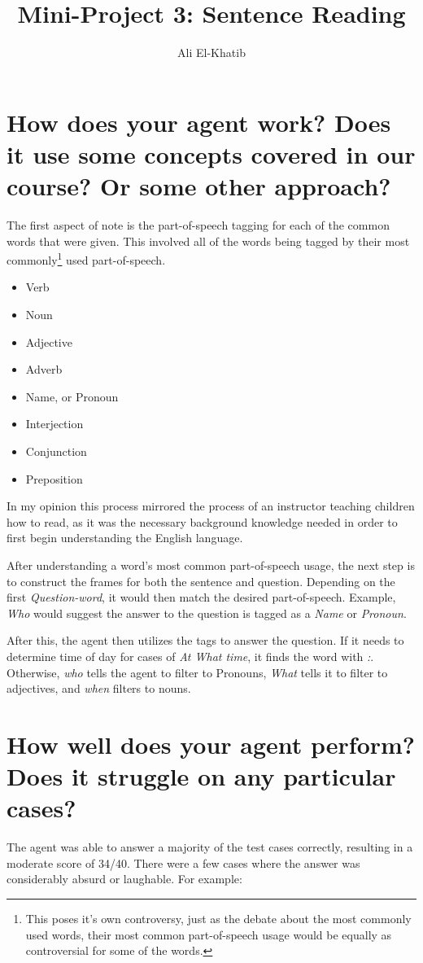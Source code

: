 \documentclass[
	letterpaper, %
]{jdf}
\author{Ali El-Khatib}
\title{Mini-Project 3: Sentence Reading}
\begin{document}
\maketitle

\section{How does your agent work? Does it use some concepts covered in our course? Or some other approach?}
The first aspect of note is the part-of-speech tagging for each of the common words that were given. This involved all of the words being tagged by their most commonly\footnote{This poses it's own controversy, just as the debate about the most commonly used words, their most common part-of-speech usage would be equally as controversial for some of the words.} used part-of-speech. 
\begin{itemize}
	\item Verb
	\item Noun
	\item Adjective
	\item Adverb
	\item Name, or Pronoun
	\item Interjection
	\item Conjunction
	\item Preposition

\end{itemize} 
In my opinion this process mirrored the process of an instructor teaching children how to read, as it was the necessary background knowledge needed in order to first begin understanding the English language.

After understanding a word's most common part-of-speech usage, the next step is to construct the frames for both the sentence and question. Depending on the first \textit{Question-word}, it would then match the desired part-of-speech. Example, \textit{Who} would suggest the answer to the question is tagged as a \textit{Name} or \textit{Pronoun}.

After this, the agent then utilizes the tags to answer the question. If it needs to determine time of day for cases of \textit{At What time}, it finds the word with \textit{:}. Otherwise, \textit{who} tells the agent to filter to Pronouns, \textit{What} tells it to filter to adjectives, and  \textit{when} filters to nouns. 

\section{How well does your agent perform? Does it struggle on any particular cases?}
The agent was able to answer a majority of the test cases correctly, resulting in a moderate score of 34/40. There were a few cases where the answer was considerably absurd or laughable. For example:
\end{document}
